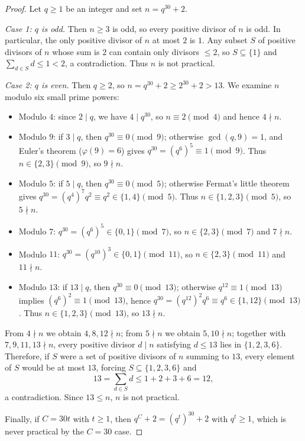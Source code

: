 \documentclass[11pt,a4paper]{article}
\begin{document}
\begin{proof}
Let $q \ge 1$ be an integer and set $n = q^{30} + 2$.

\medskip\noindent\emph{Case 1: $q$ is odd.}
Then $n \ge 3$ is odd, so every positive divisor of $n$ is odd. In particular, the only positive divisor of $n$ at most $2$ is $1$. Any subset $S$ of positive divisors of $n$ whose sum is $2$ can contain only divisors $\le 2$, so $S \subseteq \{1\}$ and $\sum_{d \in S} d \le 1 < 2$, a contradiction. Thus $n$ is not practical.

\medskip\noindent\emph{Case 2: $q$ is even.}
Then $q \ge 2$, so $n = q^{30} + 2 \ge 2^{30} + 2 > 13$. We examine $n$ modulo six small prime powers:
\begin{itemize}
\item Modulo $4$: since $2 \mid q$, we have $4 \mid q^{30}$, so $n \equiv 2 \pmod{4}$ and hence $4 \nmid n$.
\item Modulo $9$: if $3 \mid q$, then $q^{30} \equiv 0 \pmod{9}$; otherwise $\gcd(q, 9) = 1$, and Euler's theorem ($\varphi(9) = 6$) gives $q^{30} = (q^6)^5 \equiv 1 \pmod{9}$. Thus $n \in \{2, 3\} \pmod{9}$, so $9 \nmid n$.
\item Modulo $5$: if $5 \mid q$, then $q^{30} \equiv 0 \pmod{5}$; otherwise Fermat's little theorem gives $q^{30} = (q^4)^7 q^2 \equiv q^2 \in \{1, 4\} \pmod{5}$. Thus $n \in \{1, 2, 3\} \pmod{5}$, so $5 \nmid n$.
\item Modulo $7$: $q^{30} = (q^6)^5 \in \{0, 1\} \pmod{7}$, so $n \in \{2, 3\} \pmod{7}$ and $7 \nmid n$.
\item Modulo $11$: $q^{30} = (q^{10})^3 \in \{0, 1\} \pmod{11}$, so $n \in \{2, 3\} \pmod{11}$ and $11 \nmid n$.
\item Modulo $13$: if $13 \mid q$, then $q^{30} \equiv 0 \pmod{13}$; otherwise $q^{12} \equiv 1 \pmod{13}$ implies $(q^6)^2 \equiv 1 \pmod{13}$, hence $q^{30} = (q^{12})^2 q^6 \equiv q^6 \in \{1, 12\} \pmod{13}$. Thus $n \in \{1, 2, 3\} \pmod{13}$, so $13 \nmid n$.
\end{itemize}
From $4 \nmid n$ we obtain $4, 8, 12 \nmid n$; from $5 \nmid n$ we obtain $5, 10 \nmid n$; together with $7, 9, 11, 13 \nmid n$, every positive divisor $d \mid n$ satisfying $d \le 13$ lies in $\{1, 2, 3, 6\}$. Therefore, if $S$ were a set of positive divisors of $n$ summing to $13$, every element of $S$ would be at most $13$, forcing $S \subseteq \{1, 2, 3, 6\}$ and
\[
13 = \sum_{d \in S} d \le 1 + 2 + 3 + 6 = 12,
\]
a contradiction. Since $13 \le n$, $n$ is not practical.

\medskip
Finally, if $C = 30 t$ with $t \ge 1$, then $q^C + 2 = (q^t)^{30} + 2$ with $q^t \ge 1$, which is never practical by the $C = 30$ case.
\end{proof}
\end{document}
